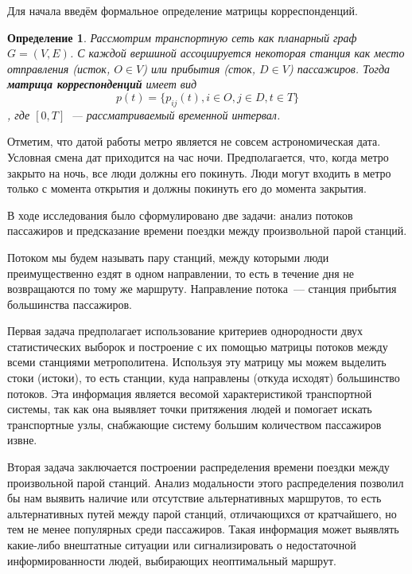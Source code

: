 \documentclass[12pt, fleqn, titlepage]{article}
\newtheorem{Def}{Определение}
\begin{document}
    Для начала введём формальное определение матрицы корреспонденций.

    \begin{Def}
            Рассмотрим транспортную сеть как планарный граф $G = (V, E)$. С каждой вершиной ассоциируется 
            некоторая станция как место отправления (исток, $O \in V$) или прибытия (сток, $D \in V$) пассажиров. 
            Тогда {\bf матрица корреспонденций} имеет вид 
            $$p(t) = \{p_{ij}(t), i \in O, j \in D, t \in T \}$$, 
            где $[0, T]$~--- рассматриваемый временной интервал.
    \end{Def}

    Отметим, что датой работы метро является не совсем астрономическая дата. 
    Условная смена дат приходится на час ночи. Предполагается, что, когда метро закрыто на ночь, все люди должны его покинуть. 
    Люди могут входить в метро только с момента открытия и должны покинуть его до момента закрытия.

    В ходе исследования было сформулировано две задачи: анализ потоков пассажиров и 
    предсказание времени поездки между произвольной парой станций.

    Потоком мы будем называть пару станций, между которыми люди преимущественно ездят в одном направлении, то 
    есть в течение дня не возвращаются по тому же маршруту. Направление потока~--- станция прибытия 
    большинства пассажиров.

    Первая задача предполагает использование критериев однородности двух статистических выборок и 
    построение с их помощью матрицы потоков между всеми станциями метрополитена. Используя эту матрицу 
    мы можем выделить стоки (истоки), то есть станции, куда направлены (откуда исходят) большинство потоков. 
    Эта информация является весомой характеристикой транспортной системы, так как она выявляет точки притяжения 
    людей и помогает искать транспортные узлы, снабжающие систему большим количеством пассажиров извне.
    
    Вторая задача заключается построении распределения времени поездки 
    между произвольной парой станций. Анализ модальности этого распределения позволил бы нам выявить 
    наличие или отсутствие альтернативных маршрутов, то есть альтернативных путей между парой станций, 
    отличающихся от кратчайшего, но тем не менее популярных среди пассажиров. Такая информация может 
    выявлять какие-либо внештатные ситуации или сигнализировать о недостаточной информированности людей, 
    выбирающих неоптимальный маршрут.
\end{document}
